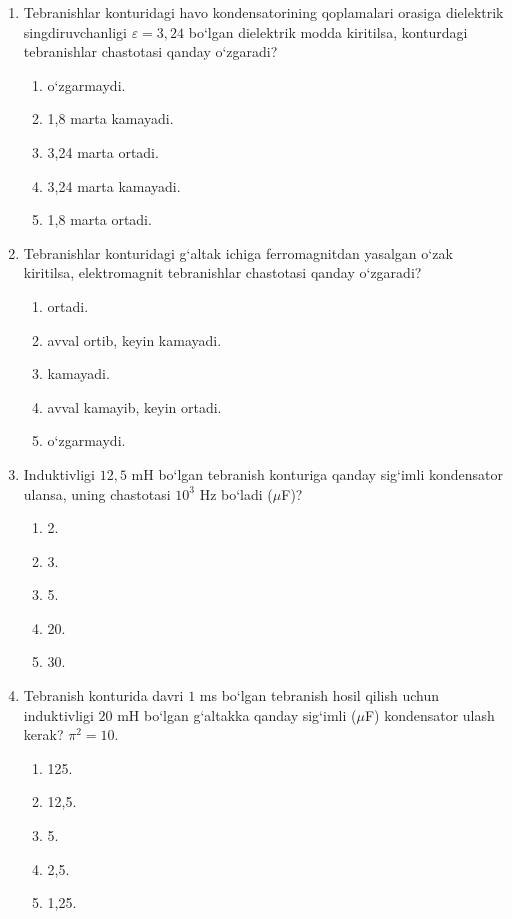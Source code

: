 \begin{enumerate}
\item Tebranishlar konturidagi havo kondensatorining qoplamalari orasiga dielektrik singdiruvchanligi $\varepsilon=3,24$ bo‘lgan dielektrik modda kiritilsa, konturdagi tebranishlar chastotasi qanday o‘zgaradi?
\begin{enumerate}[label=\Alph*)]
\item o‘zgarmaydi.
\item 1,8 marta kamayadi.
\item 3,24 marta ortadi.
\item 3,24 marta kamayadi.
\item 1,8 marta ortadi.
\end{enumerate}

\item Tebranishlar konturidagi g‘altak ichiga ferromagnitdan yasalgan o‘zak kiritilsa, elektromagnit tebranishlar chastotasi qanday o‘zgaradi?
\begin{enumerate}[label=\Alph*)]
\item ortadi.
\item avval ortib, keyin kamayadi.
\item kamayadi.
\item avval kamayib, keyin ortadi.
\item o‘zgarmaydi.
\end{enumerate}

\item Induktivligi $12,5$ mH bo‘lgan tebranish konturiga qanday sig‘imli kondensator ulansa, uning chastotasi $10^3$ Hz bo‘ladi ($\mu$F)?
\begin{enumerate}[label=\Alph*)]
\item 2.
\item 3.
\item 5.
\item 20.
\item 30.
\end{enumerate}

\item Tebranish konturida davri $1$ ms bo‘lgan tebranish hosil qilish uchun induktivligi $20$ mH bo‘lgan g‘altakka qanday sig‘imli ($\mu$F) kondensator ulash kerak? $\pi^2=10$.
\begin{enumerate}[label=\Alph*)]
\item 125.
\item 12,5.
\item 5.
\item 2,5.
\item 1,25.
\end{enumerate}


\end{enumerate}
